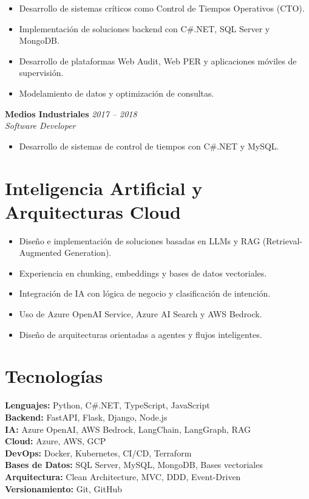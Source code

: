 \documentclass[11pt,a4paper]{article}
\begin{document}
\begin{itemize}
  \item Desarrollo de sistemas críticos como Control de Tiempos Operativos (CTO).
  \item Implementación de soluciones backend con C\#.NET, SQL Server y MongoDB.
  \item Desarrollo de plataformas Web Audit, Web PER y aplicaciones móviles de supervisión.
  \item Modelamiento de datos y optimización de consultas.
\end{itemize}

\textbf{Medios Industriales} \hfill \textit{2017 – 2018}\\
\textit{Software Developer}

\begin{itemize}
  \item Desarrollo de sistemas de control de tiempos con C\#.NET y MySQL.
\end{itemize}

\section*{Inteligencia Artificial y Arquitecturas Cloud}

\begin{itemize}
  \item Diseño e implementación de soluciones basadas en LLMs y RAG (Retrieval-Augmented Generation).
  \item Experiencia en chunking, embeddings y bases de datos vectoriales.
  \item Integración de IA con lógica de negocio y clasificación de intención.
  \item Uso de Azure OpenAI Service, Azure AI Search y AWS Bedrock.
  \item Diseño de arquitecturas orientadas a agentes y flujos inteligentes.
\end{itemize}

\section*{Tecnologías}

\textbf{Lenguajes:} Python, C\#.NET, TypeScript, JavaScript\\
\textbf{Backend:} FastAPI, Flask, Django, Node.js\\
\textbf{IA:} Azure OpenAI, AWS Bedrock, LangChain, LangGraph, RAG\\
\textbf{Cloud:} Azure, AWS, GCP\\
\textbf{DevOps:} Docker, Kubernetes, CI/CD, Terraform\\
\textbf{Bases de Datos:} SQL Server, MySQL, MongoDB, Bases vectoriales\\
\textbf{Arquitectura:} Clean Architecture, MVC, DDD, Event-Driven\\
\textbf{Versionamiento:} Git, GitHub
\end{document}
